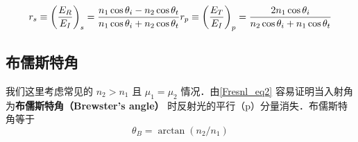 \begin{equation}\label{Fresnl_eq3}
r_s \equiv \left(\frac{E_R}{E_I}\right)_s = \frac{n_1\cos{\theta_i} - n_2\cos\theta_t}{n_1\cos\theta_i + n_2\cos\theta_t}
\\
r_p \equiv \left(\frac{E_T}{E_I}\right)_p =  \frac{2 n_1\cos\theta_i}{n_2\cos\theta_i + n_1\cos\theta_t}
\end{equation}


\subsection{布儒斯特角}
我们这里考虑常见的 $n_2>n_1$ 且 $\mu_1 = \mu_2$ 情况．由\autoref{Fresnl_eq2} 容易证明当入射角为\textbf{布儒斯特角（Brewster's angle）} 时反射光的平行（p）分量消失．布儒斯特角等于
\begin{equation}
\theta_B = \arctan (n_2/n_1)
\end{equation}
